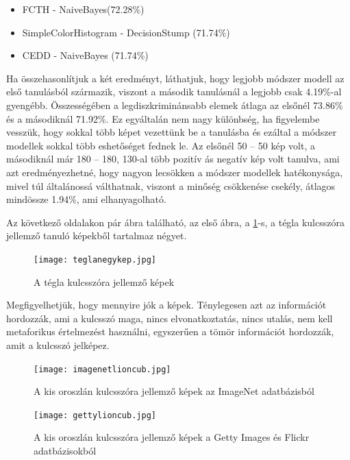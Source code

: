 \documentclass[12pt, a4paper, oneside]{book}
\theoremstyle{tetel}
\begin{document}
\begin{itemize}
  \item FCTH - NaiveBayes(72.28\%)
  \item SimpleColorHistogram - DecisionStump (71.74\%)
  \item CEDD - NaiveBayes (71.74\%)
\end{itemize}

	Ha összehasonlítjuk a két eredményt, láthatjuk, hogy legjobb módszer modell az első tanulásból származik, viszont a második tanulásnál a legjobb csak 4.19\%-al gyengébb. Összességében a legdiszkriminánsabb elemek átlaga az elsőnél 73.86\% és a másodiknál 71.92\%. Ez egyáltalán nem nagy különbség, ha figyelembe vesszük, hogy sokkal több képet vezettünk be a tanulásba és ezáltal a módszer modellek sokkal több eshetőséget fednek le. Az elsőnél 50 – 50 kép volt, a másodiknál már 180 – 180, 130-al több pozitív ás negatív kép volt tanulva, ami azt eredményezhetné, hogy nagyon lecsökken a módszer modellek hatékonysága, mivel túl általánossá válthatnak, viszont a minőség csökkenése csekély, átlagos mindössze 1.94\%, ami elhanyagolható. 

	Az következő oldalakon pár ábra található, az első ábra, a \ref{hidkcsjk}-s, a tégla kulcsszóra jellemző tanuló képekből tartalmaz négyet.

\begin{figure}[h]
\begin{center}
\texttt{[image: teglanegykep.jpg]}
\caption{{ A tégla kulcsszóra jellemző képek }}
\label{hidkcsjk}
\end{center}
\end{figure}

	Megfigyelhetjük, hogy mennyire jók a képek. Ténylegesen azt az információt hordozzák, ami a kulcsszó maga, nincs elvonatkoztatás, nincs utalás, nem kell metaforikus értelmezést használni, egyszerűen a tömör információt hordozzák, amit a kulcsszó jelképez.

\newpage

\begin{figure}[h]
\begin{center}
\texttt{[image: imagenetlioncub.jpg]}
\caption{{ A kis oroszlán kulcsszóra jellemző képek az ImageNet  \cite{3} adatbázisból}}
\label{kisoroszlan4kep}

\vspace{0.2cm}

\texttt{[image: gettylioncub.jpg]}
\caption{{ A kis oroszlán kulcsszóra jellemző képek a Getty Images \cite{2} és Flickr \cite{1} adatbázisokból}}
\label{kisoroszlan4gettykep}
\end{center}
\end{figure}
\end{document}
